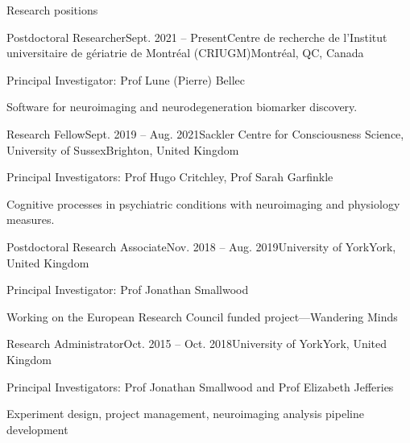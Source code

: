 \documentclass{resume} %
\begin{document}
%

%

\begin{rSection}{Research positions}

  \begin{rSubsection}{Postdoctoral Researcher}{Sept. 2021 -- Present}{Centre de recherche de l'Institut universitaire de g\'eriatrie de Montr\'eal (CRIUGM)}{Montr\'eal, QC, Canada}
    \item Principal Investigator: Prof Lune (Pierre) Bellec
    \item Software for neuroimaging and neurodegeneration biomarker discovery.
  \end{rSubsection}

  \begin{rSubsection}{Research Fellow}{Sept. 2019 -- Aug. 2021}{Sackler Centre for Consciousness Science, University of Sussex}{Brighton, United Kingdom}
    \item Principal Investigators: Prof Hugo Critchley, Prof Sarah Garfinkle
    \item Cognitive processes in psychiatric conditions with neuroimaging and physiology measures.
  \end{rSubsection}

  \begin{rSubsection}{Postdoctoral Research Associate}{Nov. 2018 -- Aug. 2019}{University of York}{York, United Kingdom}
  \item Principal Investigator: Prof Jonathan Smallwood
  \item Working on the European Research Council funded project---Wandering Minds
  \end{rSubsection}

  \begin{rSubsection}{Research Administrator}{Oct. 2015 -- Oct. 2018}{University of York}{York, United Kingdom}
    \item Principal Investigators: Prof Jonathan Smallwood and Prof Elizabeth Jefferies
    \item Experiment design, project management, neuroimaging analysis pipeline development
  \end{rSubsection}

  \end{rSection}
\end{document}
